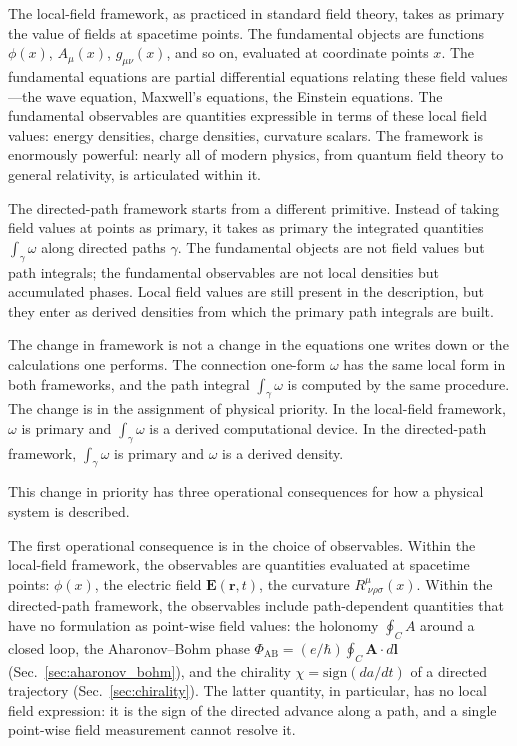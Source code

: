 \documentclass[%
 reprint, amsmath,amssymb, aps, prb, ]{revtex4-2}
\numberwithin{equation}{section}
\begin{document}
The local-field framework, as practiced in standard field theory, takes as primary the value of fields at spacetime points. The fundamental objects are functions $\phi(x)$, $A_\mu(x)$, $g_{\mu\nu}(x)$, and so on, evaluated at coordinate points $x$. The fundamental equations are partial differential equations relating these field values---the wave equation, Maxwell's equations, the Einstein equations. The fundamental observables are quantities expressible in terms of these local field values: energy densities, charge densities, curvature scalars. The framework is enormously powerful: nearly all of modern physics, from quantum field theory to general relativity, is articulated within it.

The directed-path framework starts from a different primitive. Instead of taking field values at points as primary, it takes as primary the integrated quantities $\int_\gamma \omega$ along directed paths $\gamma$. The fundamental objects are not field values but path integrals; the fundamental observables are not local densities but accumulated phases. Local field values are still present in the description, but they enter as derived densities from which the primary path integrals are built.

The change in framework is not a change in the equations one writes down or the calculations one performs. The connection one-form $\omega$ has the same local form in both frameworks, and the path integral $\int_\gamma \omega$ is computed by the same procedure. The change is in the assignment of physical priority. In the local-field framework, $\omega$ is primary and $\int_\gamma \omega$ is a derived computational device. In the directed-path framework, $\int_\gamma \omega$ is primary and $\omega$ is a derived density.

This change in priority has three operational consequences for how a physical system is described.

The first operational consequence is in the choice of observables. Within the local-field framework, the observables are quantities evaluated at spacetime points: $\phi(x)$, the electric field $\mathbf{E}(\mathbf{r}, t)$, the curvature $R^\mu_{\;\nu\rho\sigma}(x)$. Within the directed-path framework, the observables include path-dependent quantities that have no formulation as point-wise field values: the holonomy $\oint_C A$ around a closed loop, the Aharonov--Bohm phase $\Phi_{\mathrm{AB}} = (e/\hbar)\oint_C \mathbf{A}\cdot d\mathbf{l}$ (Sec.~\ref{sec:aharonov_bohm}), and the chirality $\chi = \mathrm{sign}(da/dt)$ of a directed trajectory (Sec.~\ref{sec:chirality}). The latter quantity, in particular, has no local field expression: it is the sign of the directed advance along a path, and a single point-wise field measurement cannot resolve it.
\end{document}
